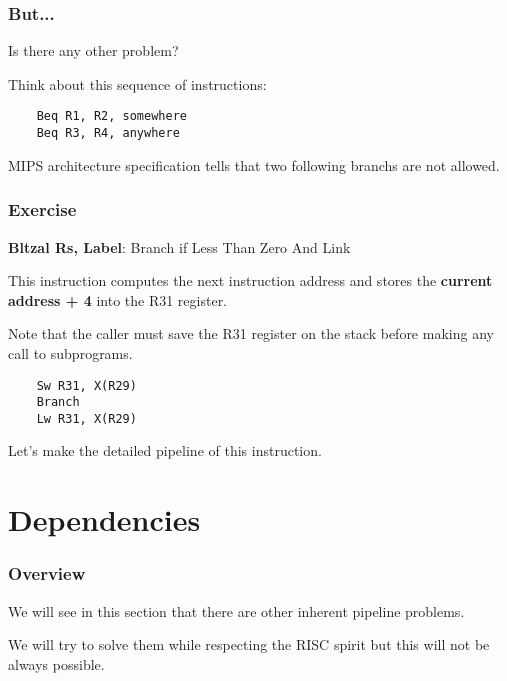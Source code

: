 \begin{frame}[containsverbatim]
  \frametitle{But...}

  Is there any other problem?

  \nl

  Think about this sequence of instructions:

  \begin{verbatim}
    Beq R1, R2, somewhere
    Beq R3, R4, anywhere
  \end{verbatim}

  \nl

  MIPS architecture specification tells that two following branchs are
  not allowed.
\end{frame}


\begin{frame}[containsverbatim]
  \frametitle{Exercise}

  \textbf{Bltzal Rs, Label}: Branch if Less Than Zero And Link

  \nl

  This instruction computes the next instruction address and stores
  the \textbf{current address + 4} into the R31 register.

  \nl

  Note that the caller must save the R31 register on the stack before
  making any call to subprograms.

  \begin{verbatim}
    Sw R31, X(R29)
    Branch
    Lw R31, X(R29)
  \end{verbatim}

  \nl

  Let's make the detailed pipeline of this instruction.
\end{frame}

%
%

\section{Dependencies}


\begin{frame}
  \frametitle{Overview}

  We will see in this section that there are other inherent pipeline
  problems.

  \nl

  We will try to solve them while respecting the RISC spirit but
  this will not be always possible.
\end{frame}

